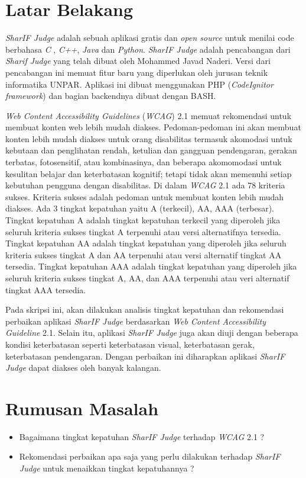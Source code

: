 \documentclass[a4paper,twoside]{article}
\begin{document}
\section{Latar Belakang}
\textit{SharIF Judge} adalah sebuah aplikasi gratis dan \textit{open source} untuk menilai code berbahasa \textit{C} , \textit{C++}, \textit{Java} dan \textit{Python}. \textit{SharIF Judge} adalah pencabangan dari \textit{Sharif Judge} yang telah dibuat oleh Mohammed Javad Naderi. Versi dari pencabangan ini memuat fitur baru yang diperlukan oleh jurusan teknik informatika UNPAR. Aplikasi ini dibuat menggunakan PHP (\textit{CodeIgnitor framework}) dan bagian backendnya dibuat dengan BASH.

\textit{Web Content Accessibility Guidelines} (\textit{WCAG}) 2.1 memuat rekomendasi untuk membuat konten web lebih mudah diakses. Pedoman-pedoman ini akan membuat konten lebih mudah diakses untuk orang disabilitas termasuk akomodasi untuk kebutaan dan penglihatan rendah, ketulian dan gangguan pendengaran, gerakan terbatas, fotosensitif, atau kombinasinya, dan beberapa akomomodasi untuk kesulitan belajar dan keterbatasan kognitif; tetapi tidak akan memenuhi setiap kebutuhan pengguna dengan disabilitas. Di dalam \textit{WCAG} 2.1 ada 78 kriteria sukses. Kriteria sukses adalah pedoman untuk membuat konten lebih mudah diakses. Ada 3 tingkat kepatuhan yaitu A (terkecil), AA, AAA (terbesar). Tingkat kepatuhan A adalah tingkat kepatuhan terkecil yang diperoleh jika seluruh kriteria sukses tingkat A terpenuhi atau versi alternatifnya tersedia. Tingkat kepatuhan AA adalah tingkat kepatuhan yang diperoleh jika seluruh kriteria sukses tingkat A dan AA terpenuhi atau versi alternatif tingkat AA tersedia. Tingkat kepatuhan AAA adalah tingkat kepatuhan yang diperoleh jika seluruh kriteria sukses tingkat A, AA, dan AAA terpenuhi atau veri alternatif tingkat AAA tersedia.

Pada skripsi ini, akan dilakukan analisis tingkat kepatuhan dan rekomendasi perbaikan aplikasi \textit{SharIF Judge} berdasarkan \textit{Web Content Accessibility Guideline} 2.1. Selain itu, aplikasi \textit{SharIF Judge} juga akan diuji dengan beberapa kondisi keterbatasan seperti keterbatasan visual, keterbatasan gerak, keterbatasan pendengaran. Dengan perbaikan ini diharapkan aplikasi \textit{SharIF Judge} dapat diakses oleh banyak kalangan.

\section{Rumusan Masalah}
\begin{itemize}
	\item Bagaimana tingkat kepatuhan \textit{SharIF Judge} terhadap \textit{WCAG} 2.1 ?
	\item Rekomendasi perbaikan apa saja yang perlu dilakukan terhadap \textit{SharIF Judge} untuk menaikkan tingkat kepatuhannya ?
\end{itemize}
\end{document}
